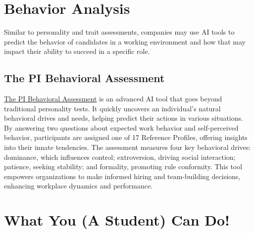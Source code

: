 \documentclass[
]{book}
\begin{document}
\hypertarget{behavior-analysis}{%
\section{Behavior Analysis}\label{behavior-analysis}}

Similar to personality and trait assessments, companies may use AI tools to predict the behavior of candidates in a working environment and how that may impact their ability to succeed in a specific role.

\hypertarget{the-pi-behavioral-assessment}{%
\subsection{The PI Behavioral Assessment}\label{the-pi-behavioral-assessment}}

\href{https://www.predictiveindex.com/assessments/behavioral-assessment/?creative=655858294556\&keyword=predictive\%20personality\%20test\&matchtype=b\&network=g\&device=c\&utm_source=google\&utm_medium=ppc\&utm_content=bofu-brand-low-value\&device=c\&matchtype=b\&utm_term=predictive\%20personality\%20test\&gad=1\&gclid=Cj0KCQjwldKmBhCCARIsAP-0rfw2xB87svR2BFTESJ6nSMzDqIs8ni8VKXiD1robOSabO6uU7wTWjagaAoHUEALw_wcB}{The PI Behavioral Assessment} is an advanced AI tool that goes beyond traditional personality tests. It quickly uncovers an individual's natural behavioral drives and needs, helping predict their actions in various situations. By answering two questions about expected work behavior and self-perceived behavior, participants are assigned one of 17 Reference Profiles, offering insights into their innate tendencies. The assessment measures four key behavioral drives: dominance, which influences control; extroversion, driving social interaction; patience, seeking stability; and formality, promoting rule conformity. This tool empowers organizations to make informed hiring and team-building decisions, enhancing workplace dynamics and performance.

\hypertarget{what-you-a-student-can-do-4}{%
\section{What You (A Student) Can Do!}\label{what-you-a-student-can-do-4}}
\end{document}
